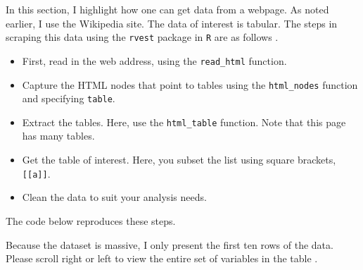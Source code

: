 \documentclass[]{tufte-handout}
\providecommand{\tightlist}{%
  \setlength{\itemsep}{0pt}\setlength{\parskip}{0pt}}
\begin{document}
In this section, I highlight how one can get data from a webpage. As
noted earlier, I use the Wikipedia site. The data of interest is
tabular. The steps in scraping this data using the \texttt{rvest}
\citep{rvest2020} package in \texttt{R} are as follows
\citep{tidyverse}.

\begin{itemize}
\tightlist
\item
  First, read in the web address, using the \texttt{read\_html}
  function.
\item
  Capture the HTML nodes that point to tables using the
  \texttt{html\_nodes} function and specifying \texttt{table}.
\item
  Extract the tables. Here, use the \texttt{html\_table} function. Note
  that this page has many tables.
\item
  Get the table of interest. Here, you subset the list using square
  brackets, \texttt{{[}{[}a{]}{]}}.
\item
  Clean the data to suit your analysis needs.
\end{itemize}

The code below reproduces these steps.

Because the dataset is massive, I only present the first ten rows of the
data. Please scroll right or left to view the entire set of variables in
the table \citep{mailund2017beginning}.
\end{document}

